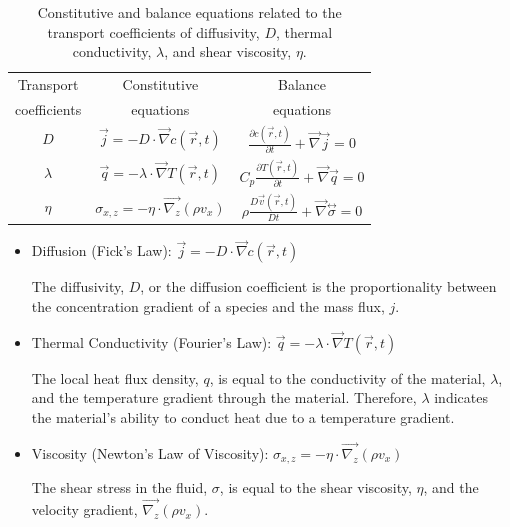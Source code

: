 \begin{table}[h]
\centering
\caption{Constitutive and balance equations related to the transport coefficients of diffusivity, $D$, thermal conductivity, $\lambda$, and shear viscosity, $\eta$.  
\label{tab:coeff}}
\renewcommand*{\arraystretch}{2}
\begin{tabular}{ ccc }
\toprule
Transport & Constitutive & Balance\\
coefficients& equations& equations\\
\hline
$D$ & $\vec{j} = -D \cdot \vec{\nabla}c(\vec{r},t)$ & $\frac{\partial c(\vec{r},t)}{\partial t}+\vec{\nabla}\vec{j}=0$ \\
$\lambda$ & $\vec{q} = -\lambda \cdot \vec{\nabla}T(\vec{r},t)$ & $C_p \frac{\partial T(\vec{r},t)}{\partial t}+\vec{\nabla}\vec{q}=0$ \\
$\eta$ & $\sigma_{x,z} = -\eta \cdot \vec{\nabla_{z}}(\rho v_x)$ & $\rho \frac{D\vec{v}(\vec{r}, t)}{Dt}+\vec{\nabla} \overset{\leftrightarrow}{\sigma}=0$\\
\bottomrule
\end{tabular}
\end{table}
\begin{itemize}
    \item Diffusion (Fick’s Law):
$\vec{j} = -D \cdot \vec{\nabla}c(\vec{r},t)$

The diffusivity, $D$, or the diffusion coefficient is the proportionality between the concentration gradient of a species and the mass flux, $j$. 

\item Thermal Conductivity (Fourier’s Law):
$\vec{q} = -\lambda \cdot \vec{\nabla}T(\vec{r},t)$

The local heat flux density, $q$, is equal to the conductivity of the material, $\lambda$, and the temperature gradient through the material. Therefore, $\lambda$ indicates the material's ability to conduct heat due to a temperature gradient. 

\item Viscosity (Newton’s Law of Viscosity): 
$\sigma_{x,z} = -\eta \cdot \vec{\nabla_{z}}(\rho v_x)$

The shear stress in the fluid, $\sigma$, is equal to the shear viscosity, $\eta$, and the velocity gradient, $\vec{\nabla_{z}}(\rho v_x)$.


\end{itemize}

